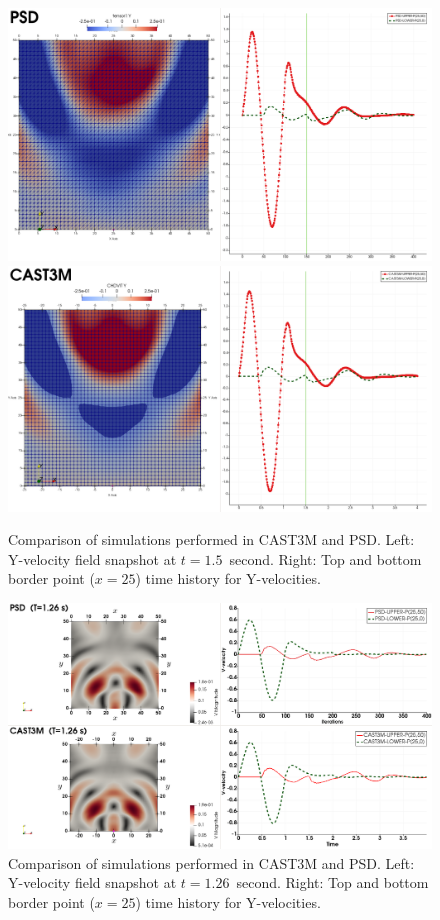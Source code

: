 \begin{figure}
	\centering
	\includegraphics[width=.8\textwidth]{./Images/PSD-t2}\\\vspace{1cm}
	\includegraphics[width=.8\textwidth]{./Images/CAST3M-t2}
	\caption{Comparison of simulations performed  in CAST3M and PSD. Left: Y-velocity field snapshot at $t=1.5$~second. Right: Top and bottom border point ($x=25$) time history for Y-velocities.   }\label{fig:CastemPSD2}
\end{figure}


\begin{figure}
	\centering
	\includegraphics[width=.8\textwidth]{./Images/Test2-CAST3M-Vs-PSD.png}
	\caption{Comparison of simulations performed  in CAST3M and PSD. Left: Y-velocity field snapshot at $t=1.26$~second. Right: Top and bottom border point ($x=25$) time history for Y-velocities.   }\label{fig:CastemPSD2-test2}
\end{figure}


